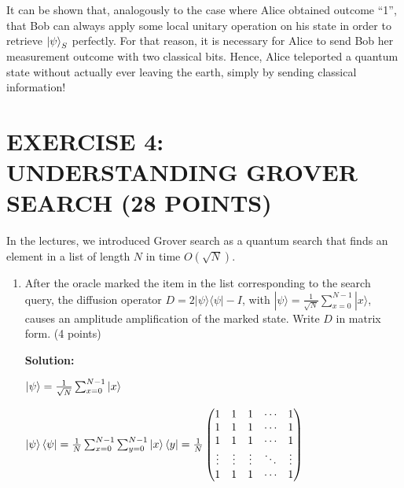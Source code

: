 \documentclass[12pt]{article}
\begin{document}
It can be shown that, analogously to the case where Alice obtained outcome “1”, that Bob can always apply some local unitary operation on his state in order to retrieve $\ket{\psi}_S$ perfectly. For that reason, it is necessary for Alice to send Bob her measurement outcome with two classical bits. Hence, Alice teleported a quantum state without actually ever leaving the earth, simply by sending classical information!


\section{EXERCISE 4: UNDERSTANDING GROVER SEARCH (28 POINTS)}
In the lectures, we introduced Grover search as a quantum search that finds an element in a list of length $N$ in time $O(\sqrt{N})$.
\begin{enumerate}
    \item After the oracle marked the item in the list corresponding to the search query, the diffusion operator $D = 2|\psi\rangle\langle\psi| - I$, with $|\psi\rangle = \frac{1}{\sqrt{N}}\sum_{x=0}^{N-1}|x\rangle$, causes an amplitude amplification of the marked state. Write $D$ in matrix form. (4 points)

          \textbf{Solution:}

          $\ket{\psi} = \frac{1}{\sqrt{N}}\sum_{x=0}^{N-1}\ket{x}$

          $\ket{\psi}\bra{\psi} = \frac{1}{N}\sum_{x=0}^{N-1}\sum_{y=0}^{N-1}\ket{x}\bra{y}=\frac{1}{N}\begin{pmatrix}
                  1      & 1      & 1      & \cdots & 1      \\
                  1      & 1      & 1      & \cdots & 1      \\
                  1      & 1      & 1      & \cdots & 1      \\
                  \vdots & \vdots & \vdots & \ddots & \vdots \\
                  1      & 1      & 1      & \cdots & 1
              \end{pmatrix}$



\end{enumerate}
\end{document}
